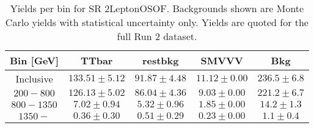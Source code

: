 \begin{table}[!htbp]
    \small
    \center
    \begin{tabular}{c|c|c|c||c}
    Bin [GeV] & TTbar & restbkg & SMVVV & Bkg\\
    \hline
    Inclusive & $133.51 \pm 5.12$ & $91.87 \pm 4.48$ & $11.12 \pm 0.00$ & $236.5 \pm 6.8$\\
    \hline
    $200-800$ & $126.13 \pm 5.02$ & $86.04 \pm 4.36$ & $9.03 \pm 0.00$ & $221.2 \pm 6.7$\\
    \hline
    $800-1350$ & $7.02 \pm 0.94$ & $5.32 \pm 0.96$ & $1.85 \pm 0.00$ & $14.2 \pm 1.3$\\
    \hline
    $1350-$ & $0.36 \pm 0.30$ & $0.51 \pm 0.29$ & $0.23 \pm 0.00$ & $1.1 \pm 0.4$\\
\end{tabular}
    \caption{Yields per bin for SR 2LeptonOSOF. Backgrounds shown are Monte Carlo yields with statistical uncertainty only. Yields are quoted for the full Run 2 dataset.}
    \label{tab:2LeptonOSOF$bins}
\end{table}
